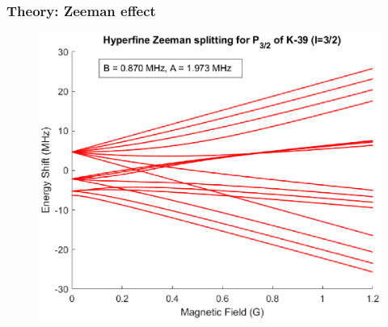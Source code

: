 \documentclass{beamer}
\theoremstyle{definition}
\begin{document}
\begin{frame}
\frametitle{Theory: Zeeman effect}


\begin{figure}[!htb]
	\centering
	\vspace{-10pt}
	\includegraphics[height=0.7\textheight]{Zeeman_hfs.eps}
\end{figure}

\end{frame}
\end{document}

